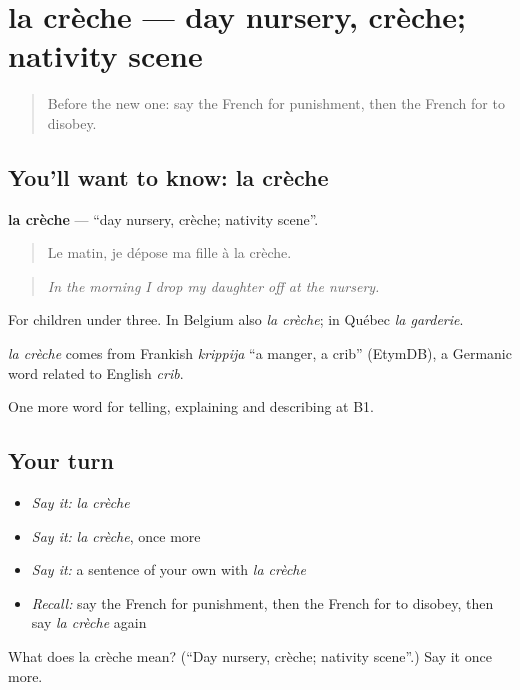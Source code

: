 \section[la crèche]{la crèche — day nursery, crèche; nativity scene}

\label{lesson:FR-C494-creche}



\begin{quote}
Before the new one: say the French for punishment, then the French for to disobey.
\end{quote}

\subsection*{You'll want to know: la crèche}
\textbf{la crèche} — \textquotedblleft{}day nursery, crèche; nativity scene\textquotedblright{}.

\begin{quote}
Le matin, je dépose ma fille à la crèche.
\end{quote}

\begin{quote}
\emph{In the morning I drop my daughter off at the nursery.}
\end{quote}

For children under three. In Belgium also \emph{la crèche}; in Québec \emph{la garderie}.

\begin{cousinweb}
\emph{la crèche} comes from Frankish \emph{krippija} \textquotedblleft{}a manger, a crib\textquotedblright{} (EtymDB), a Germanic word related to English \emph{crib}.
\end{cousinweb}

\begin{grammarlens}[title={What you've built}]
One more word for telling, explaining and describing at B1.
\end{grammarlens}

\subsection*{Your turn}
\begin{itemize}
\raggedright
  \item \emph{Say it:} \emph{la crèche}
  \item \emph{Say it:} \emph{la crèche}, once more
  \item \emph{Say it:} a sentence of your own with \emph{la crèche}
  \item \emph{Recall:} say the French for punishment, then the French for to disobey, then say \emph{la crèche} again
\end{itemize}

\begin{tcolorbox}[breakable,colback=teal!4,colframe=teal!35!black,title={Before you move on}]
What does la crèche mean? (\textquotedblleft{}Day nursery, crèche; nativity scene\textquotedblright{}.) Say it once more.
\end{tcolorbox}
